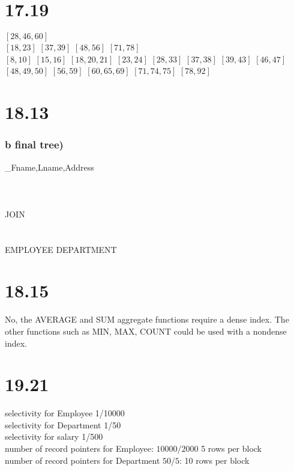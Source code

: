 \documentclass[11pt]{article}
\theoremstyle{plain}
\theoremstyle{definition}
\begin{document}
\section*{17.19}
					      $[28, 46, 60]$\\
		$[18, 23]$          $[37, 39] $        $[48, 56]$         $[71, 78]$\\
$[8, 10]$   $[15, 16]$   $[18, 20, 21]$  $[23, 24]$  $[28, 33]$  $[37, 38]$  $[39,43]$  $[46, 47] $ $[48, 49 ,50]$  $[56, 59]$ $[60, 65, 69]$  $[71, 74, 75]$ $[78, 92]$\\

\section*{18.13}
\subsubsection*{b final tree)}

		\pi_{Fname,Lname,Address} \\
			\downarrow \\
	    \\
	     \downarrow \\
	    JOIN\\
	    \downarrow \\
	    		\swarrow \hspace{30mm}  \searrow {} \\
EMPLOYEE \hspace{10mm} DEPARTMENT

\section*{18.15}
No, the AVERAGE and SUM aggregate functions require a dense index. The other functions such as MIN, MAX, COUNT could be used with a nondense index.\\

\section*{19.21}
selectivity for Employee 1/10000\\
selectivity for Department 1/50\\
selectivity for salary 1/500\\
number of record pointers for Employee:  $10000/2000$ 5 rows per block\\
number of record pointers for Department $50/5$: 10 rows per block\\
\end{document}
